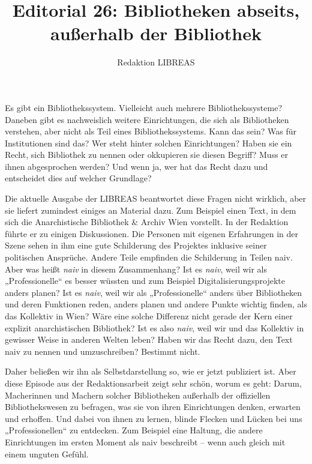 \documentclass[a4paper,
fontsize=11pt,
oneside,
numbers=noperiodatend,
parskip=half-,
bibliography=totoc,
final
]{scrartcl}
\title{\LARGE{Editorial 26: Bibliotheken \underline{\hspace{0.8cm}}abseits, außerhalb der Bibliothek}} %
\author{Redaktion LIBREAS} %
\date{}
\begin{document}
\maketitle
\thispagestyle{fancyplain} 


Es gibt ein Bibliothekssystem. Vielleicht auch mehrere
Bibliothekssysteme? Daneben gibt es nachweislich weitere Einrichtungen,
die sich als Bibliotheken verstehen, aber nicht als Teil eines
Bibliothekssystems. Kann das sein? Was für Institutionen sind das? Wer
steht hinter solchen Einrichtungen? Haben sie ein Recht, sich Bibliothek
zu nennen oder okkupieren sie diesen Begriff? Muss er ihnen abgesprochen
werden? Und wenn ja, wer hat das Recht dazu und entscheidet dies auf
welcher Grundlage?

Die aktuelle Ausgabe der LIBREAS beantwortet diese Fragen nicht
wirklich, aber sie liefert zumindest einiges an Material dazu. Zum
Beispiel einen Text, in dem sich die Anarchistische Bibliothek \& Archiv
Wien vorstellt. In der Redaktion führte er zu einigen Diskussionen. Die
Personen mit eigenen Erfahrungen in der Szene sehen in ihm eine gute
Schilderung des Projektes inklusive seiner politischen Ansprüche. Andere
Teile empfinden die Schilderung in Teilen naiv. Aber was heißt
\emph{naiv} in diesem Zusammenhang? Ist es \emph{naiv}, weil wir als
„Professionelle`` es besser wüssten und zum Beispiel
Digitalisierungsprojekte anders planen? Ist es \emph{naiv}, weil wir als
„Professionelle`` anders über Bibliotheken und deren Funktionen reden,
anders planen und andere Punkte wichtig finden, als das Kollektiv in
Wien? Wäre eine solche Differenz nicht gerade der Kern einer explizit
anarchistischen Bibliothek? Ist es also \emph{naiv}, weil wir und das
Kollektiv in gewisser Weise in anderen Welten leben? Haben wir das Recht
dazu, den Text naiv zu nennen und umzuschreiben? Bestimmt nicht.

Daher beließen wir ihn als Selbstdarstellung so, wie er jetzt publiziert
ist. Aber diese Episode aus der Redaktionsarbeit zeigt sehr schön, worum
es geht: Darum, Macherinnen und Machern solcher Bibliotheken außerhalb
der offiziellen Bibliothekswesen zu befragen, was sie von ihren
Einrichtungen denken, erwarten und erhoffen. Und dabei von ihnen zu
lernen, blinde Flecken und Lücken bei uns „Professionellen`` zu
entdecken. Zum Beispiel eine Haltung, die andere Einrichtungen im ersten
Moment als naiv beschreibt -- wenn auch gleich mit einem unguten Gefühl.
\end{document}

